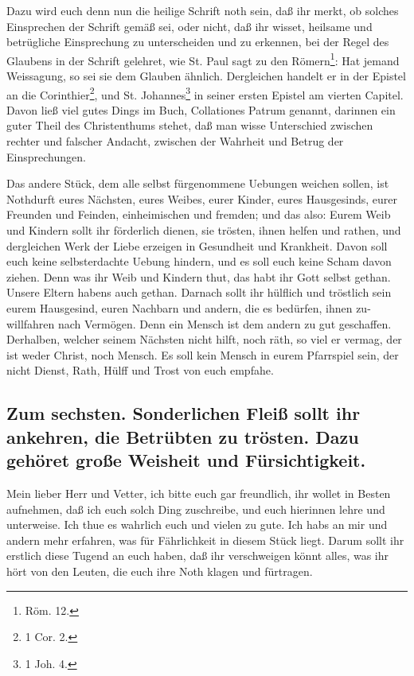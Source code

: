 Dazu wird euch denn nun die heilige Schrift noth sein, daß ihr merkt, ob solches Einsprechen der Schrift gemäß sei, oder nicht, daß ihr wisset, heilsame und betrügliche Einsprechung zu unterscheiden und zu erkennen, bei der Regel des Glaubens in der Schrift gelehret, wie St. Paul sagt zu den Römern\footnote{Röm. 12.}: Hat jemand Weissagung, so sei sie dem Glauben ähnlich. Dergleichen handelt er in der Epistel an die Corinthier\footnote{1 Cor. 2.}, und St. Johannes\footnote{1 Joh. 4.} in seiner ersten Epistel am vierten Capitel. Davon ließ viel gutes Dings im Buch, Collationes Patrum genannt, darinnen ein guter Theil des Christenthums stehet, daß man wisse Unterschied zwischen rechter und falscher Andacht, zwischen der Wahrheit und Betrug der Einsprechungen.

Das andere Stück, dem alle selbst fürgenommene Uebungen weichen sollen, ist Nothdurft eures Nächsten, eures Weibes, eurer Kinder, eures Hausgesinds, eurer Freunden und Feinden, einheimischen und fremden; und das also: Eurem Weib und Kindern sollt ihr förderlich dienen, sie trösten, ihnen helfen und rathen, und dergleichen Werk der Liebe erzeigen in Gesundheit und Krankheit. Davon soll euch keine selbsterdachte Uebung hindern, und es soll euch keine Scham davon ziehen. Denn was ihr Weib und Kindern thut, das habt ihr Gott selbst gethan. Unsere Eltern habens auch gethan. Darnach sollt ihr
hülflich und tröstlich sein eurem Hausgesind, euren Nachbarn und andern, die es bedürfen, ihnen zu-willfahren nach Vermögen. Denn ein Mensch ist dem andern zu gut geschaffen. Derhalben, welcher seinem Nächsten nicht hilft, noch räth, so viel er vermag, der ist weder Christ, noch Mensch. Es soll kein Mensch in eurem Pfarrspiel sein, der nicht Dienst, Rath, Hülff und Trost von euch empfahe.

\subsection*{Zum sechsten. Sonderlichen Fleiß sollt ihr ankehren, die Betrübten zu trösten. Dazu gehöret große Weisheit und Fürsichtigkeit.}

Mein lieber Herr und Vetter, ich bitte euch gar freundlich, ihr wollet in Besten aufnehmen, daß ich euch solch Ding zuschreibe, und euch hierinnen lehre und unterweise. Ich thue es wahrlich euch und vielen zu gute. Ich habs an mir und andern mehr erfahren, was für Fährlichkeit in diesem Stück liegt. Darum sollt ihr erstlich diese Tugend an euch haben, daß ihr verschweigen könnt alles, was ihr hört von den Leuten, die euch ihre Noth klagen und fürtragen.

